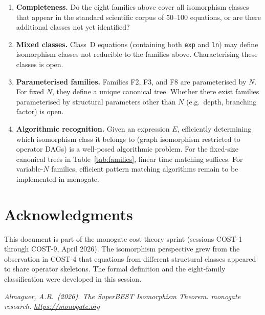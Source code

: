\documentclass[12pt,a4paper]{article}
\theoremstyle{definition}
\begin{document}
\begin{enumerate}
  \item \textbf{Completeness.}  Do the eight families above cover all
        isomorphism classes that appear in the standard scientific corpus of
        50--100 equations, or are there additional classes not yet identified?

  \item \textbf{Mixed classes.}  Class~D equations (containing both
        \texttt{exp} and \texttt{ln}) may define isomorphism classes not
        reducible to the families above.  Characterising these classes is open.

  \item \textbf{Parameterised families.}  Families F2, F3, and F8 are
        parameterised by $N$.  For fixed $N$, they define a unique canonical
        tree.  Whether there exist families parameterised by structural
        parameters other than $N$ (e.g.\ depth, branching factor) is open.

  \item \textbf{Algorithmic recognition.}  Given an expression $E$, efficiently
        determining which isomorphism class it belongs to (graph isomorphism
        restricted to operator DAGs) is a well-posed algorithmic problem.
        For the fixed-size canonical trees in Table~\ref{tab:families}, linear
        time matching suffices.  For variable-$N$ families, efficient pattern
        matching algorithms remain to be implemented in monogate.
\end{enumerate}

\section*{Acknowledgments}

This document is part of the monogate cost theory sprint (sessions COST-1
through COST-9, April 2026).  The isomorphism perspective grew from the
observation in COST-4 that equations from different structural classes appeared
to share operator skeletons.  The formal definition and the eight-family
classification were developed in this session.

\bigskip
\noindent\textit{Almaguer, A.R.\ (2026).
The SuperBEST Isomorphism Theorem.
monogate research. \url{https://monogate.org}}
\end{document}
